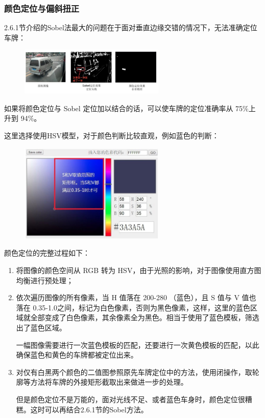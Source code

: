 \subsubsection{颜色定位与偏斜扭正}
2.6.1节介绍的Sobel法最大的问题在于面对垂直边缘交错的情况下，无法准确定位车牌：
\begin{figure}[H]
    \centering 
    \includegraphics[width=0.618\textwidth]{image/2_6_2_1.jpg}    
    \label{logic}
\end{figure}
如果将颜色定位与 Sobel 定位加以结合的话，可以使车牌的定位准确率从 75\%上升到 94\%。 

这里选择使用HSV模型，对于颜色判断比较直观，例如蓝色的判断：
\begin{figure}[H]
    \centering 
    \includegraphics[width=0.618\textwidth]{image/2_6_2_2.jpg}    
    \label{logic}
\end{figure}
颜色定位的完整过程如下：
\begin{enumerate}
\item
将图像的颜色空间从 RGB 转为 HSV，由于光照的影响，对于图像使用直方图均衡进行预处理；
\item
依次遍历图像的所有像素，当 H 值落在 200-280 （蓝色），且 S 值与 V 值也落在 0.35-1.0之间，标记为白色像素，否则为黑色像素，这样，这里的蓝色区域就全部变成了白色像素，其余像素全为黑色。相当于使用了蓝色模板，筛选出了蓝色区域。

一幅图像需要进行一次蓝色模板的匹配，还要进行一次黄色模板的匹配，以此确保蓝色和黄色的车牌都被定位出来。 
\item
对仅有白黑两个颜色的二值图参照原先车牌定位中的方法，使用闭操作，取轮廓等方法将车牌的外接矩形截取出来做进一步的处理。

但是颜色定位不是万能的，面对光线不足、或者蓝色车身时，颜色定位很糟糕。这时可以再结合2.6.1节的Sobel方法。
\end{enumerate}

